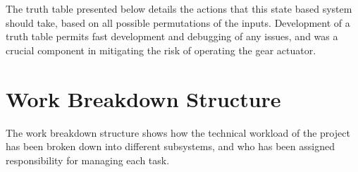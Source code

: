 \documentclass[main.tex]{subfiles}
\begin{document}
\begin{appendices}
The truth table presented below details the actions that this state based system should take, based on all possible permutations of the inputs. Development of a truth table permits fast development and debugging of any issues, and was a crucial component in mitigating the risk of operating the gear actuator.






\chapter{Work Breakdown Structure}
The work breakdown structure shows how the technical workload of the project has been broken down into different  subsystems, and who has been assigned responsibility for managing each task. 


\end{appendices}
\end{document}
